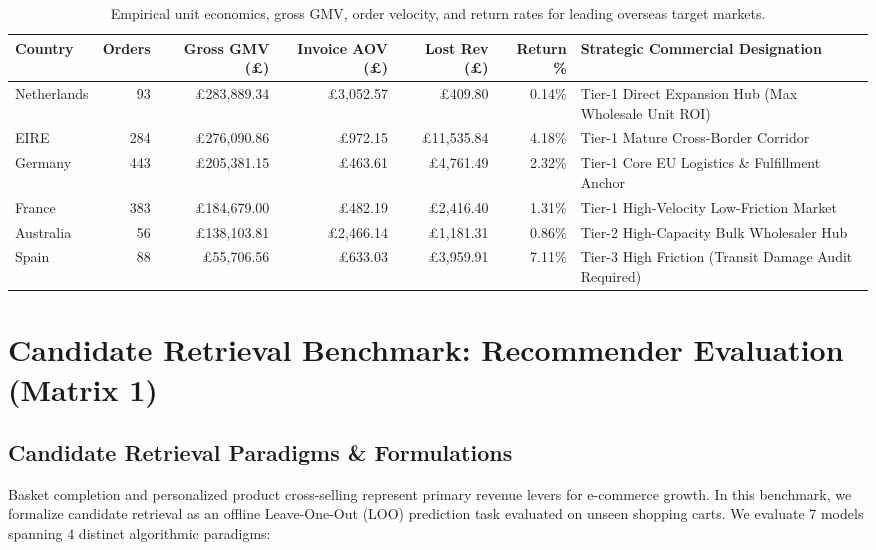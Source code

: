 \documentclass[sigconf,nonacm]{acmart}
\begin{document}
\begin{table}[t]
\centering
\small
\caption{Empirical unit economics, gross GMV, order velocity, and return rates for leading overseas target markets.}
\label{tab:overseas}
\begin{tabular}{lrrrrrl}
\toprule
\textbf{Country} & \textbf{Orders} & \textbf{Gross GMV (£)} & \textbf{Invoice AOV (£)} & \textbf{Lost Rev (£)} & \textbf{Return \%} & \textbf{Strategic Commercial Designation} \\
\midrule
Netherlands & 93 & £283,889.34 & £3,052.57 & £409.80 & 0.14\% & Tier-1 Direct Expansion Hub (Max Wholesale Unit ROI) \\
EIRE & 284 & £276,090.86 & £972.15 & £11,535.84 & 4.18\% & Tier-1 Mature Cross-Border Corridor \\
Germany & 443 & £205,381.15 & £463.61 & £4,761.49 & 2.32\% & Tier-1 Core EU Logistics \& Fulfillment Anchor \\
France & 383 & £184,679.00 & £482.19 & £2,416.40 & 1.31\% & Tier-1 High-Velocity Low-Friction Market \\
Australia & 56 & £138,103.81 & £2,466.14 & £1,181.31 & 0.86\% & Tier-2 High-Capacity Bulk Wholesaler Hub \\
Spain & 88 & £55,706.56 & £633.03 & £3,959.91 & 7.11\% & Tier-3 High Friction (Transit Damage Audit Required) \\
\bottomrule
\end{tabular}
\end{table}

\section{Candidate Retrieval Benchmark: Recommender Evaluation (Matrix 1)}

\subsection{Candidate Retrieval Paradigms \& Formulations}
Basket completion and personalized product cross-selling represent primary revenue levers for e-commerce growth. In this benchmark, we formalize candidate retrieval as an offline Leave-One-Out (LOO) prediction task evaluated on unseen shopping carts. We evaluate 7 models spanning 4 distinct algorithmic paradigms:
\end{document}
